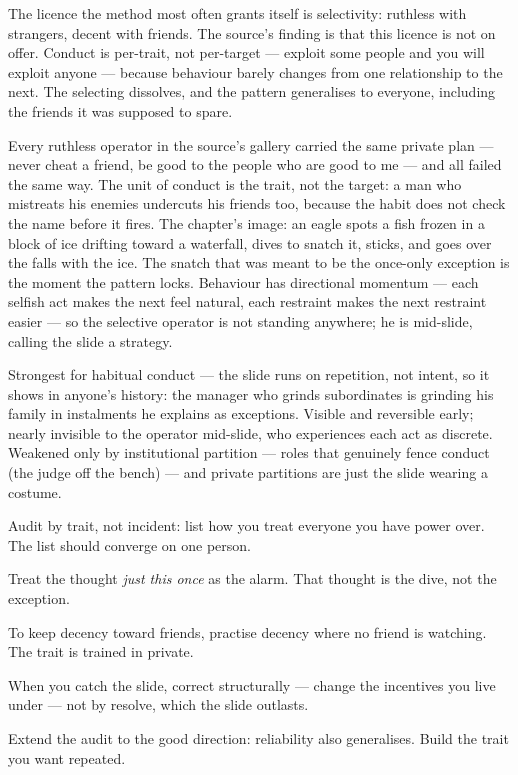 \begin{core}
The licence the method most often grants itself is selectivity: ruthless with strangers, decent with friends. The source's finding is that this licence is not on offer. Conduct is per-trait, not per-target --- exploit some people and you will exploit anyone --- because behaviour barely changes from one relationship to the next. The selecting dissolves, and the pattern generalises to everyone, including the friends it was supposed to spare.
\end{core}
\begin{mechanism}
Every ruthless operator in the source's gallery carried the same private plan --- never cheat a friend, be good to the people who are good to me --- and all failed the same way. The unit of conduct is the trait, not the target: a man who mistreats his enemies undercuts his friends too, because the habit does not check the name before it fires. The chapter's image: an eagle spots a fish frozen in a block of ice drifting toward a waterfall, dives to snatch it, sticks, and goes over the falls with the ice. The snatch that was meant to be the once-only exception is the moment the pattern locks. Behaviour has directional momentum --- each selfish act makes the next feel natural, each restraint makes the next restraint easier --- so the selective operator is not standing anywhere; he is mid-slide, calling the slide a strategy.
\end{mechanism}
\begin{conditions}
Strongest for habitual conduct --- the slide runs on repetition, not intent, so it shows in anyone's history: the manager who grinds subordinates is grinding his family in instalments he explains as exceptions. Visible and reversible early; nearly invisible to the operator mid-slide, who experiences each act as discrete. Weakened only by institutional partition --- roles that genuinely fence conduct (the judge off the bench) --- and private partitions are just the slide wearing a costume.
\end{conditions}
\begin{application}
  \item Audit by trait, not incident: list how you treat everyone you have power over. The list should converge on one person.
  \item Treat the thought \emph{just this once} as the alarm. That thought is the dive, not the exception.
  \item To keep decency toward friends, practise decency where no friend is watching. The trait is trained in private.
  \item When you catch the slide, correct structurally --- change the incentives you live under --- not by resolve, which the slide outlasts.
  \item Extend the audit to the good direction: reliability also generalises. Build the trait you want repeated.
\end{application}
